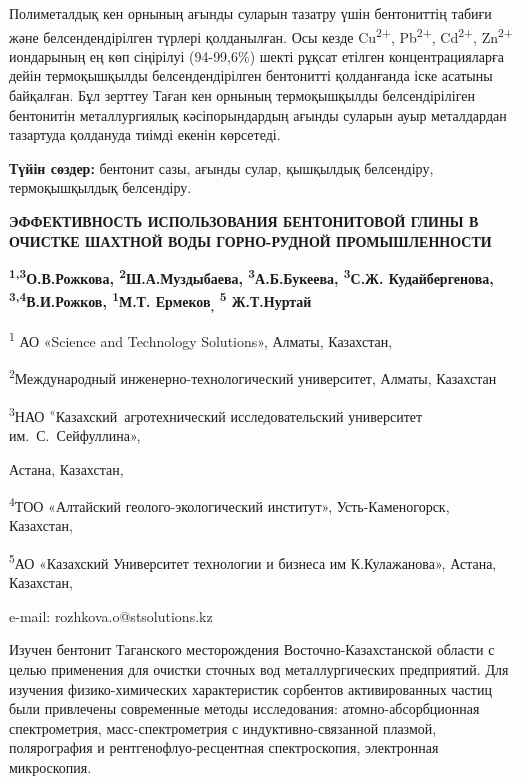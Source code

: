 Полиметалдық кен орнының ағынды суларын тазатру үшін бентониттің табиғи
және белсендендірілген түрлері қолданылған. Осы кезде
Cu\textsuperscript{2+}, Pb\textsuperscript{2+}, Cd\textsuperscript{2+},
Zn\textsuperscript{2+} иондарының ең көп сіңірілуі (94-99,6\%) шекті
рұқсат етілген концентрацияларға дейін термоқышқылды белсендендірілген
бентонитті қолданғанда іске асатыны байқалған. Бұл зерттеу Таған кен
орнының термоқышқылды белсендіріліген бентонитін металлургиялық
кәсіпорындардың ағынды суларын ауыр металдардан тазартуда қолдануда
тиімді екенін көрсетеді.

{\bfseries Түйін сөздер:} бентонит сазы, ағынды сулар, қышқылдық
белсендіру, термоқышқылдық белсендіру.

\begin{center}
{\large\bfseries ЭФФЕКТИВНОСТЬ ИСПОЛЬЗОВАНИЯ БЕНТОНИТОВОЙ ГЛИНЫ В ОЧИСТКЕ ШАХТНОЙ
ВОДЫ ГОРНО-РУДНОЙ ПРОМЫШЛЕННОСТИ}

{\bfseries \textsuperscript{1,3}О.В.Рожкова\envelope, \textsuperscript{2}Ш.А.Муздыбаева, \textsuperscript{3}А.Б.Букеева, \textsuperscript{3}С.Ж. Кудайбергенова, \textsuperscript{3,4}В.И.Рожков, \textsuperscript{1}М.Т. Ермеков\textsubscript{,} \textsuperscript{5} Ж.Т.Нуртай}

\textsuperscript{1} АО «Science and Technology Solutions», Алматы,
Казахстан,

\textsuperscript{2}Международный инженерно-технологический университет,
Алматы, Казахстан

\textsuperscript{3}НАО \textsuperscript{«}Казахский~агротехнический
исследовательский университет им.~С.~Сейфуллина»,

Астана, Казахстан,

\textsuperscript{4}ТОО «Алтайский геолого-экологический институт»,
Усть-Каменогорск, Казахстан,

\textsuperscript{5}АО «Казахский Университет технологии и бизнеса им
К.Кулажанова», Астана, Казахстан,

e-mail: rozhkova.o@stsolutions.kz
\end{center}

Изучен бентонит Таганского месторождения Восточно-Казахстанской области
с целью применения для очистки сточных вод металлургических предприятий.
Для изучения физико-химических характеристик сорбентов активированных
частиц были привлечены современные методы исследования:
атомно-абсорбционная спектрометрия, масс-спектрометрия с
индуктивно-связанной плазмой, полярография и рентгенофлуо-ресцентная
спектроскопия, электронная микроскопия.

